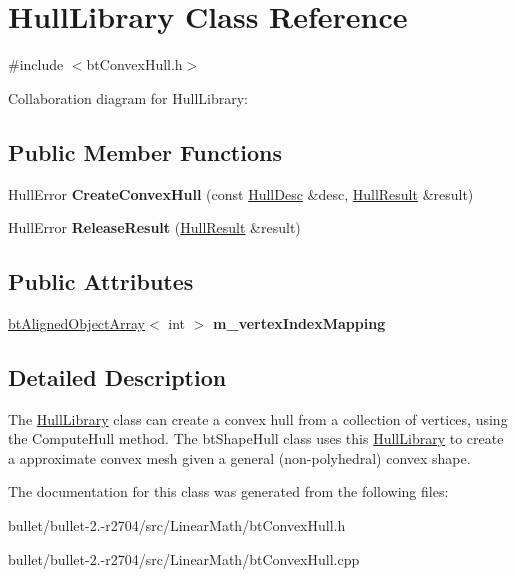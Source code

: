 \hypertarget{class_hull_library}{\section{Hull\+Library Class Reference}
\label{class_hull_library}
}


{\ttfamily \#include $<$bt\+Convex\+Hull.\+h$>$}



Collaboration diagram for Hull\+Library\+:
\subsection*{Public Member Functions}
\begin{DoxyCompactItemize}
\item 
\hypertarget{class_hull_library_a28e5dc544a9d0f326f5b9e02dac656f0}{Hull\+Error {\bfseries Create\+Convex\+Hull} (const \hyperlink{class_hull_desc}{Hull\+Desc} \&desc, \hyperlink{class_hull_result}{Hull\+Result} \&result)}\label{class_hull_library_a28e5dc544a9d0f326f5b9e02dac656f0}

\item 
\hypertarget{class_hull_library_a1694479ac11e270c9f8f13164c0f6dcf}{Hull\+Error {\bfseries Release\+Result} (\hyperlink{class_hull_result}{Hull\+Result} \&result)}\label{class_hull_library_a1694479ac11e270c9f8f13164c0f6dcf}

\end{DoxyCompactItemize}
\subsection*{Public Attributes}
\begin{DoxyCompactItemize}
\item 
\hypertarget{class_hull_library_a5c0d232fa545cdf3feda25bc9c9462ce}{\hyperlink{classbt_aligned_object_array}{bt\+Aligned\+Object\+Array}$<$ int $>$ {\bfseries m\+\_\+vertex\+Index\+Mapping}}\label{class_hull_library_a5c0d232fa545cdf3feda25bc9c9462ce}

\end{DoxyCompactItemize}


\subsection{Detailed Description}
The \hyperlink{class_hull_library}{Hull\+Library} class can create a convex hull from a collection of vertices, using the Compute\+Hull method. The bt\+Shape\+Hull class uses this \hyperlink{class_hull_library}{Hull\+Library} to create a approximate convex mesh given a general (non-\/polyhedral) convex shape. 

The documentation for this class was generated from the following files\+:\begin{DoxyCompactItemize}
\item 
bullet/bullet-\/2.-\/r2704/src/\+Linear\+Math/bt\+Convex\+Hull.\+h\item 
bullet/bullet-\/2.-\/r2704/src/\+Linear\+Math/bt\+Convex\+Hull.\+cpp\end{DoxyCompactItemize}
